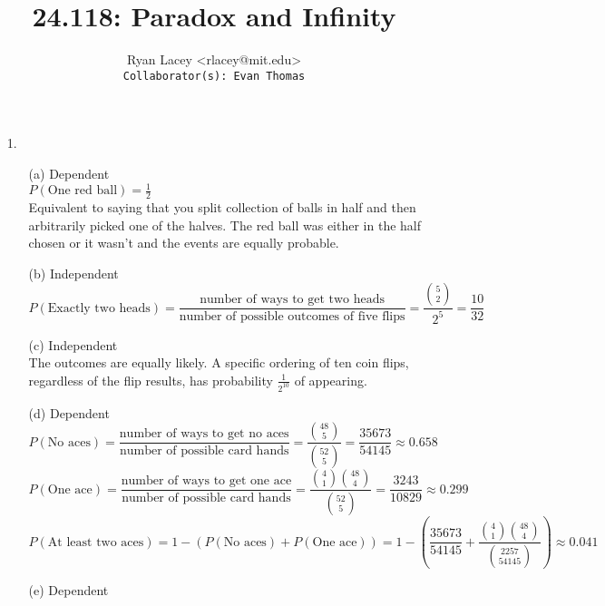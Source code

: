 \documentclass{article}
\begin{document}

\title{24.118: Paradox and Infinity}
\author{
  Ryan Lacey <rlacey@mit.edu>\\
  \footnotesize \texttt{Collaborator(s): Evan Thomas}
}
        
\maketitle
        


\begin{enumerate}
\item[1.]
	\begin{enumerate}
	\item[(a)] 
			Dependent\\
			
			$P(\text{One red ball}) = \frac{1}{2}$\\
			
			Equivalent to saying that you split collection of balls in half and then arbitrarily picked one of the halves. The red ball was either in the half chosen or it wasn't and the events are equally probable.
\bigskip
	\item[(b)] 
			Independent\\
			
			$P(\text{Exactly two heads}) = \dfrac{\text{number of ways to get two heads}}{\text{number of possible outcomes of five flips}} = \dfrac{\binom{5}{2}}{2^5} = \dfrac{10}{32}$
\bigskip
	\item[(c)] 
			Independent\\
			
			The outcomes are equally likely. A specific ordering of ten coin flips, regardless of the flip results, has probability $\frac{1}{2^{10}}$ of appearing.
\bigskip
	\item[(d)] 
			Dependent\\
			
			$P(\text{No aces})= \dfrac{\text{number of ways to get no aces}}{\text{number of possible card hands}} = \dfrac{\binom{48}{5}}{\binom{52}{5}} = \dfrac{35673}{54145} \approx 0.658$\\
			
			$P(\text{One ace})= \dfrac{\text{number of ways to get one ace}}{\text{number of possible card hands}} = \dfrac{\binom{4}{1}\binom{48}{4}}{\binom{52}{5}} = \dfrac{3243}{10829} \approx 0.299$\\
			
			$P(\text{At least two aces})= 1 - \left(P(\text{No aces}) + P(\text{One ace})\right) = 1 - \left(\dfrac{35673}{54145} + \dfrac{\binom{4}{1}\binom{48}{4}}{\binom{2257}{54145}} \right) \approx 0.041$
\bigskip
	\item[(e)] 
			Dependent\\
			

\end{enumerate}
\end{enumerate}
\end{document}
